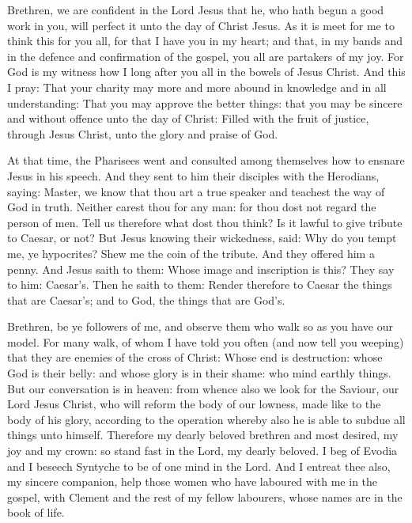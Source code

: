 \begin{multicols}{2}


Brethren, we are confident in the Lord Jesus that he, who hath begun a good
work in you, will perfect it unto the day of Christ Jesus.
As it is meet for me to think this for you all, for that I have you
in my heart; and that, in my bands and in the defence and confirmation
of the gospel, you all are partakers of my joy.
For God is my witness how I long after you all in the bowels of
Jesus Christ.
And this I pray: That your charity may more and more abound in
knowledge and in all understanding:
That you may approve the better things: that you may be sincere
and without offence unto the day of Christ:
Filled with the fruit of justice, through Jesus Christ, unto the
glory and praise of God.



At that time, the Pharisees went and consulted among themselves how to
ensnare Jesus in his speech.
And they sent to him their disciples with the Herodians, saying:
Master, we know that thou art a true speaker and teachest the way of God
in truth. Neither carest thou for any man: for thou dost not regard the
person of men.
Tell us therefore what dost thou think? Is it lawful to give
tribute to Caesar, or not?
But Jesus knowing their wickedness, said: Why do you tempt me, ye
hypocrites?
Shew me the coin of the tribute. And they offered him a penny.
And Jesus saith to them: Whose image and inscription is this?
They say to him: Caesar's. Then he saith to them: Render
therefore to Caesar the things that are Caesar's; and to God, the things
that are God's.

\bigskip




Brethren, be ye followers of me, and observe them who walk so as
you have our model.
For many walk, of whom I have told you often (and now tell you
weeping) that they are enemies of the cross of Christ:
Whose end is destruction: whose God is their belly: and whose
glory is in their shame: who mind earthly things.
But our conversation is in heaven: from whence also we look for
the Saviour, our Lord Jesus Christ,
who will reform the body of our lowness, made like to the body of
his glory, according to the operation whereby also he is able to subdue
all things unto himself.
Therefore my dearly beloved brethren and most desired, my joy and
my crown: so stand fast in the Lord, my dearly beloved.
I beg of Evodia and I beseech Syntyche to be of one mind in the
Lord.
And I entreat thee also, my sincere companion, help those women who
have laboured with me in the gospel, with Clement and the rest of my
fellow labourers, whose names are in the book of life.



\end{multicols}
